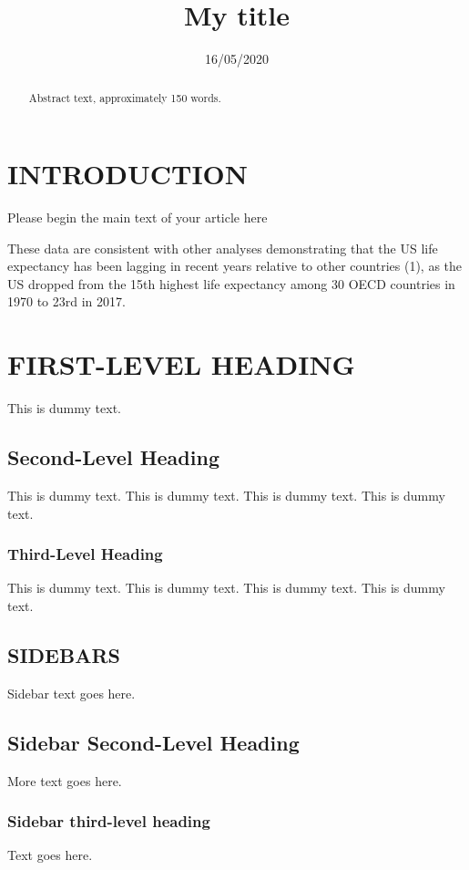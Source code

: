 \documentclass[
]{ar-1col}
\title{My title}
\author{}
\date{\vspace{-2.5em}16/05/2020}
\begin{document}
\maketitle

{
\setcounter{tocdepth}{2}
\tableofcontents
}
\begin{abstract}
Abstract text, approximately 150 words. 
\end{abstract}

\hypertarget{introduction}{%
\section{INTRODUCTION}\label{introduction}}

Please begin the main text of your article here \citep{Harper:2017ad}

These data are consistent with other analyses demonstrating that the US
life expectancy has been lagging in recent years relative to other
countries (1), as the US dropped from the 15th highest life expectancy
among 30 OECD countries in 1970 to 23rd in 2017.

\hypertarget{first-level-heading}{%
\section{FIRST-LEVEL HEADING}\label{first-level-heading}}

This is dummy text.

\hypertarget{second-level-heading}{%
\subsection{Second-Level Heading}\label{second-level-heading}}

This is dummy text. This is dummy text. This is dummy text. This is
dummy text.

\hypertarget{third-level-heading}{%
\subsubsection{Third-Level Heading}\label{third-level-heading}}

This is dummy text. This is dummy text. This is dummy text. This is
dummy text.

\begin{textbox}[h]\section{SIDEBARS}
Sidebar text goes here.
\subsection{Sidebar Second-Level Heading}
More text goes here.\subsubsection{Sidebar third-level heading}
Text goes here.\end{textbox}

  
\end{document}
